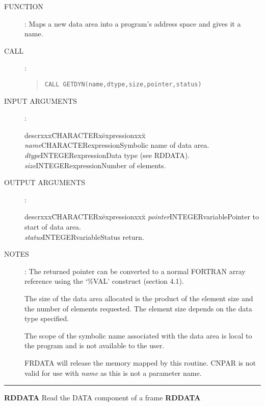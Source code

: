 \documentclass{article}
\begin{document}
\begin{description}
\item [FUNCTION]:
Maps a new data area into a program's address space and gives it a name.
\item [CALL]:
\begin{quote}
{\tt CALL GETDYN(name,dtype,size,pointer,status)}
\end{quote}
\item [INPUT ARGUMENTS]:
\begin{tabbing}
descrxxx\=CHARACTERx\=expressionxxx\=\kill
{\em name}\>CHARACTER\>expression\>Symbolic name of data area.\\
{\em dtype}\>INTEGER\>expression\>Data type (see RDDATA).\\
{\em size}\>INTEGER\>expression\>Number of elements.
\end{tabbing}
\item [OUTPUT ARGUMENTS]:
\begin{tabbing}
descrxxx\=CHARACTERx\=expressionxxx\=\kill
{\em pointer}\>INTEGER\>variable\>Pointer to start of data area.\\
{\em status}\>INTEGER\>variable\>Status return.
\end{tabbing}
\item [NOTES]:
The returned pointer can be converted to a normal FORTRAN array reference using
the `\%VAL' construct (section 4.1).

The size of the data area allocated is the product of the element size and the
number of elements requested.
The element size depends on the data type specified.

The scope of the symbolic name associated with the data area is local to the
program and is not available to the user.

FRDATA will release the memory mapped by this routine.
CNPAR is not valid for use with {\em name} as this is not a parameter name.
\end{description}
\rule{\textwidth}{0.3mm}
{\Large {\bf RDDATA} \hfill Read the DATA component of a frame \hfill {\bf RDDATA}}
\end{document}

